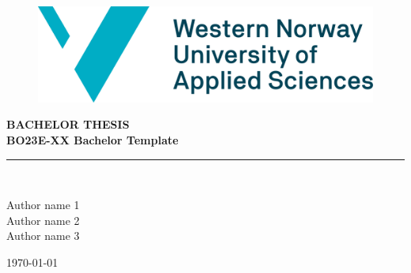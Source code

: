 \thispagestyle{empty}

\begin{figure}[!hb]
\centering
\includegraphics[scale=0.5]{images/logo/hvl_logo_en_rgb.png}
\end{figure}
\vspace{1cm}

\begin{center}
\textbf{\LARGE{BACHELOR THESIS}}\\
\vspace{0.75cm}
\textbf{\LARGE{BO23E-XX Bachelor Template}}\\
\noindent\rule{\textwidth}{0.2pt}\\
\end{center}

\vspace{1cm}

\begin{center}
\Large{Author name 1}\\
\Large{Author name 2}\\
\Large{Author name 3}\\
\end{center}

\begin{center}
\vfill{}
\end{center}

\begin{center}
\large{\today}
\end{center}

\pagebreak